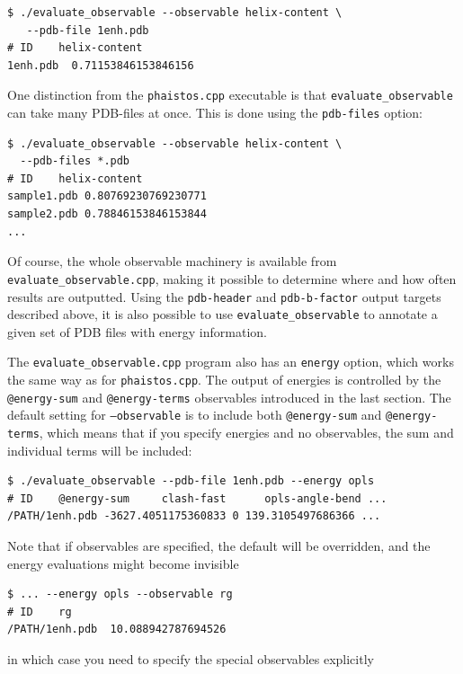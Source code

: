 \documentclass[11pt,a4paper,twoside]{book}
\begin{document}
\begin{verbatim}
$ ./evaluate_observable --observable helix-content \
   --pdb-file 1enh.pdb
# ID    helix-content   
1enh.pdb  0.71153846153846156
\end{verbatim}

\noindent
One distinction from the \texttt{phaistos.cpp} executable is that
\texttt{evaluate\_ob\-serv\-ab\-le} can take many PDB-files at once. This is
done using the \texttt{pdb-files} option:

\begin{verbatim}
$ ./evaluate_observable --observable helix-content \
  --pdb-files *.pdb
# ID    helix-content   
sample1.pdb 0.80769230769230771
sample2.pdb 0.78846153846153844
...
\end{verbatim}

\noindent
Of course, the whole observable machinery is available from
\texttt{evaluate\_ob\-serv\-ab\-le.cpp}, making it possible to determine
where and how often results are outputted. Using the
\texttt{pdb-header} and \texttt{pdb-b-factor} output targets described
above, it is also possible to use \texttt{evaluate\_ob\-serv\-ab\-le}
to annotate a given set of PDB files with energy information.

The \texttt{evaluate\_observable.cpp} program also has an
\texttt{energy} option, which works the same way as for
\texttt{phaistos.cpp}. The output of energies is controlled by the
\texttt{@energy-sum} and \texttt{@energy-terms} observables introduced
in the last section. The default setting for \texttt{--observable} is
to include both \texttt{@energy-sum} and \texttt{@energy-terms}, which
means that if you specify energies and no observables, the sum and
individual terms will be included:

\begin{verbatim}
$ ./evaluate_observable --pdb-file 1enh.pdb --energy opls 
# ID    @energy-sum     clash-fast      opls-angle-bend ...
/PATH/1enh.pdb -3627.4051175360833 0 139.3105497686366 ...
\end{verbatim}

\noindent
Note that if observables are specified, the default will be
overridden, and the energy evaluations might become invisible

\begin{verbatim}
$ ... --energy opls --observable rg                       
# ID    rg      
/PATH/1enh.pdb  10.088942787694526
\end{verbatim}

\noindent
in which case you need to specify the special observables explicitly
\end{document}
